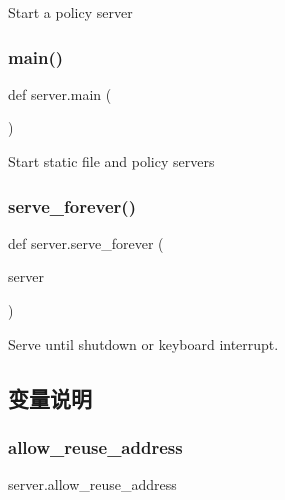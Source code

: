 \begin{DoxyVerb}Start a policy server\end{DoxyVerb}
 \mbox{\label{namespaceserver_a6d1c10ed8aa5d27e61ed9db6b4274261}} 
\subsubsection{\texorpdfstring{main()}{main()}}
{\footnotesize\ttfamily def server.\+main (\begin{DoxyParamCaption}{ }\end{DoxyParamCaption})}

\begin{DoxyVerb}Start static file and policy servers\end{DoxyVerb}
 \mbox{\label{namespaceserver_a1a282be6be1de080e6276cb7b4f19769}} 
\subsubsection{\texorpdfstring{serve\+\_\+forever()}{serve\_forever()}}
{\footnotesize\ttfamily def server.\+serve\+\_\+forever (\begin{DoxyParamCaption}\item[{}]{server }\end{DoxyParamCaption})}

\begin{DoxyVerb}Serve until shutdown or keyboard interrupt.\end{DoxyVerb}
 

\subsection{变量说明}
\mbox{\label{namespaceserver_a4370bca87712ae693b825e12c75eb8de}} 
\subsubsection{\texorpdfstring{allow\+\_\+reuse\+\_\+address}{allow\_reuse\_address}}
{\footnotesize\ttfamily server.\+allow\+\_\+reuse\+\_\+address}

